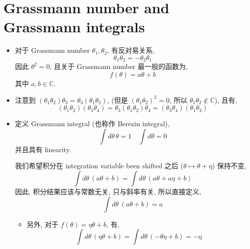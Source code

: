 \section{Grassmann number and Grassmann integrals} \label{B.2}
\begin{itemize}
	\item 对于 Grassmann number $\theta_1, \theta_2$, 有反对易关系,
	\begin{equation}
		\theta_1 \theta_2 = - \theta_2 \theta_1
	\end{equation}
	因此 $\theta^2 = 0$, 且关于 Grassmann number 最一般的函数为,
	\begin{equation}
		f(\theta) = a \theta + b
	\end{equation}
	其中 $a, b \in \mathbb{C}$.
	
	\item 注意到 $(\theta_1 \theta_2) \theta_3 = \theta_3 (\theta_1 \theta_2)$, (但是 $(\theta_1 \theta_2)^2 = 0$, 所以 $\theta_1 \theta_2 \notin \mathbb{C}$), 且有,
	\begin{equation}
		(\theta_1 \theta_2) (\theta_3 \theta_4) = \theta_3 (\theta_1 \theta_2) \theta_4 = (\theta_3 \theta_4) (\theta_1 \theta_2)
	\end{equation}
	
	\item 定义 Grassmann integral (也称作 Berezin integral),
	\begin{equation}
		\int d\theta \, \theta = 1 \quad \int d\theta = 0
	\end{equation}
	并且具有 linearity.
	
	\begin{tcolorbox}[title=comment:]
		我们希望积分在 integration variable been shifted 之后 ($\theta \mapsto \theta + \eta$) 保持不变,
		\begin{equation}
			\int d\theta \, (a \theta + b) = \int d\theta \, (a \theta + a \eta + b)
		\end{equation}
		因此, 积分结果应该与常数无关, 只与斜率有关, 所以直接定义,
		\begin{equation}
			\int d\theta \, (a \theta + b) = a
		\end{equation}
	\end{tcolorbox}
	
	\begin{itemize}
		\item 另外, 对于 $f(\theta) = \eta \theta + b$, 有,
		\begin{equation}
			\int d\theta \, (\eta \theta + b) = \int d\theta \, (- \theta \eta + b) = - \eta
		\end{equation}
	\end{itemize}
\end{itemize}

